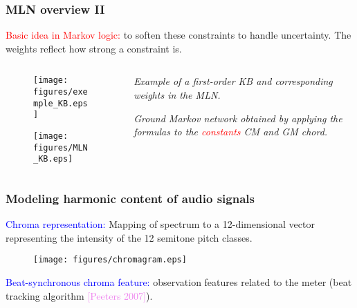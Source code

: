 \documentclass[12pt]{beamer}
\begin{document}
\begin{frame}
\frametitle{MLN overview II}
\textcolor{red}{Basic idea in Markov logic:} to soften these constraints to handle uncertainty. The weights reflect how strong a constraint is.
\medskip

\begin{columns}[c] 
\begin{column}{0.65\textwidth} 

\vspace{-0.3cm}
\begin{figure}[htb]
   \centering
   \texttt{[image: figures/exemple\_KB.eps]}
\end{figure}

\vspace{-0.6cm}
\begin{figure}[htb]
   \centering
   \texttt{[image: figures/MLN\_KB.eps]}
\end{figure}

\end{column} 

\begin{column}{0.35\textwidth} 
\vspace{-0.2cm}

\textit{Example of a first-order KB and corresponding weights in the MLN.}

\vspace{0.8cm}

\textit{Ground Markov network obtained by applying the formulas to the \textcolor{red}{constants} CM and GM chord.}

\end{column} 
\end{columns} 
\end{frame}




\begin{frame}
\frametitle{Modeling harmonic content of audio signals}

\bigskip

\textcolor{blue}{Chroma representation:} Mapping of spectrum
to a 12-dimensional vector representing the intensity of the 12
semitone pitch classes.
\medskip


\vspace{-0.5cm}
\begin{figure}[htb]
   \centering
   \texttt{[image: figures/chromagram.eps]}
\end{figure}

\textcolor{blue}{Beat-synchronous chroma feature:} observation features related to the meter (beat tracking algorithm \textcolor{violet}{[Peeters 2007]}).

\end{frame}
\end{document}
